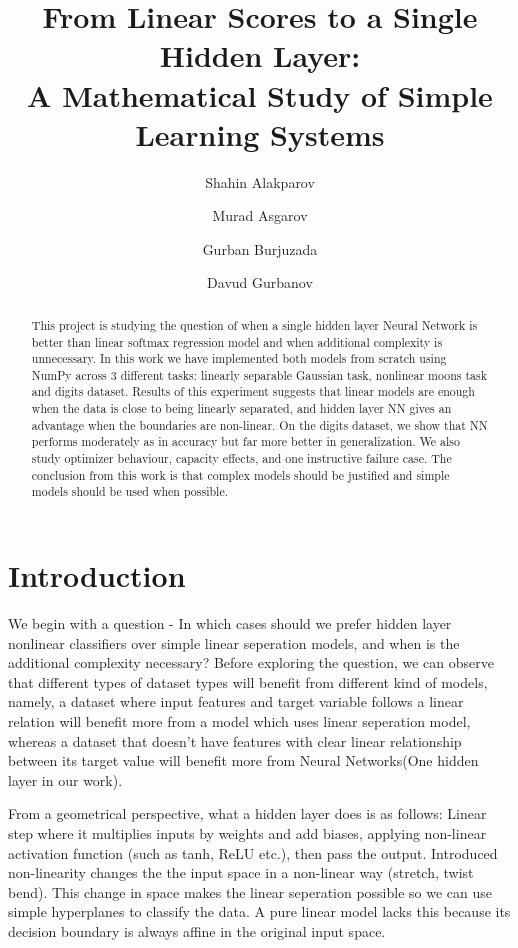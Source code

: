 \documentclass[11pt]{article}
\title{From Linear Scores to a Single Hidden Layer:\\
A Mathematical Study of Simple Learning Systems}
\author{Shahin Alakparov \and Murad Asgarov \and Gurban Burjuzada \and Davud Gurbanov}
\date{}
\begin{document}
\maketitle

\begin{abstract}
This project is studying the question of when a single hidden layer Neural Network is better than linear softmax regression model and when additional complexity is unnecessary. In this work we have implemented both models from scratch using NumPy across 3 different tasks: linearly separable Gaussian task, nonlinear moons task and digits dataset. Results of this experiment suggests that linear models are enough when the data is close to being linearly separated, and hidden layer NN gives an advantage when the boundaries are non-linear. On the digits dataset, we show that NN performs moderately as in accuracy but far more better in generalization. We also
study optimizer behaviour, capacity effects, and one instructive failure case.
The conclusion from this work is that complex models should be justified and simple models should be used when possible.
\end{abstract}

\section{Introduction}

We begin with a question - In which cases should we prefer hidden layer nonlinear classifiers over simple linear seperation models, and when is the additional complexity necessary?
Before exploring the question, we can observe that different types of dataset types will benefit from different kind of models, namely, a dataset where input features and target variable follows a linear relation will benefit more from a model which uses linear seperation model, whereas a dataset that doesn't have features with clear linear relationship between its target value will benefit more from Neural Networks(One hidden layer in our work).

From a geometrical perspective, what a hidden layer does is as follows: Linear step where it multiplies inputs by weights and add biases, applying non-linear activation function (such as tanh, ReLU etc.), then pass the output. Introduced non-linearity changes the the input space in a non-linear way (stretch, twist bend). This change in space makes the linear seperation possible so we can use simple hyperplanes to classify the data. A pure linear model lacks this because its decision boundary is always affine in the original input space.
\end{document}
